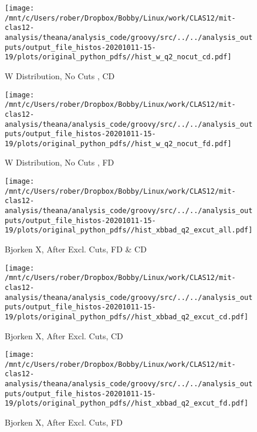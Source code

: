 \documentclass{article}
\begin{document}
\begin{landscape}
    \begin{figure}[h]
        \centering

        \texttt{[image: /mnt/c/Users/rober/Dropbox/Bobby/Linux/work/CLAS12/mit-clas12-analysis/theana/analysis\_code/groovy/src/../../analysis\_outputs/output\_file\_histos-20201011-15-19/plots/original\_python\_pdfs//hist\_w\_q2\_nocut\_cd.pdf]}
        \captionsetup{textformat=empty,labelformat=blank}
        \caption{W Distribution, No Cuts , CD}
    \end{figure}
    \clearpage
    
    \begin{figure}[h]
        \centering

        \texttt{[image: /mnt/c/Users/rober/Dropbox/Bobby/Linux/work/CLAS12/mit-clas12-analysis/theana/analysis\_code/groovy/src/../../analysis\_outputs/output\_file\_histos-20201011-15-19/plots/original\_python\_pdfs//hist\_w\_q2\_nocut\_fd.pdf]}
        \captionsetup{textformat=empty,labelformat=blank}
        \caption{W Distribution, No Cuts , FD}
    \end{figure}
    \clearpage
    
    \begin{figure}[h]
        \centering

        \texttt{[image: /mnt/c/Users/rober/Dropbox/Bobby/Linux/work/CLAS12/mit-clas12-analysis/theana/analysis\_code/groovy/src/../../analysis\_outputs/output\_file\_histos-20201011-15-19/plots/original\_python\_pdfs//hist\_xbbad\_q2\_excut\_all.pdf]}
        \captionsetup{textformat=empty,labelformat=blank}
        \caption{Bjorken X, After Excl. Cuts, FD \& CD}
    \end{figure}
    \clearpage
    
    \begin{figure}[h]
        \centering

        \texttt{[image: /mnt/c/Users/rober/Dropbox/Bobby/Linux/work/CLAS12/mit-clas12-analysis/theana/analysis\_code/groovy/src/../../analysis\_outputs/output\_file\_histos-20201011-15-19/plots/original\_python\_pdfs//hist\_xbbad\_q2\_excut\_cd.pdf]}
        \captionsetup{textformat=empty,labelformat=blank}
        \caption{Bjorken X, After Excl. Cuts, CD}
    \end{figure}
    \clearpage
    
    \begin{figure}[h]
        \centering

        \texttt{[image: /mnt/c/Users/rober/Dropbox/Bobby/Linux/work/CLAS12/mit-clas12-analysis/theana/analysis\_code/groovy/src/../../analysis\_outputs/output\_file\_histos-20201011-15-19/plots/original\_python\_pdfs//hist\_xbbad\_q2\_excut\_fd.pdf]}
        \captionsetup{textformat=empty,labelformat=blank}
        \caption{Bjorken X, After Excl. Cuts, FD}
    \end{figure}
    \clearpage
    

\end{landscape}
\end{document}
